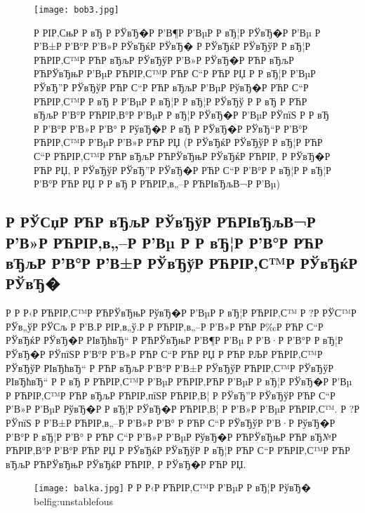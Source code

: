 \documentclass[a4paper,14pt]{extarticle}
\begin{document}
\begin{figure}[h!]
\centering
\texttt{[image: bob3.jpg]}
\caption{Р  РІР‚СњР  Р вЂ Р  РЎвЂ�Р  Р’В¶Р  Р’ВµР  Р вЂ¦Р  РЎвЂ�Р  Р’Вµ Р  Р’В±Р  Р’В°Р  Р’В»Р  РЎвЂќР  РЎвЂ� Р  РЎвЂќР  РЎвЂўР  Р вЂ¦Р РЋРІР‚С™Р РЋР вЂљР  РЎвЂўР  Р’В»Р  РЎвЂ�Р РЋР вЂљР РЋРЎвЂњР  Р’ВµР РЋРІР‚С™Р РЋР С“Р РЋР РЏ Р  Р вЂ¦Р  Р’ВµР  РЎвЂ”Р  РЎвЂўР РЋР С“Р РЋР вЂљР  Р’ВµР  РўвЂ�Р РЋР С“Р РЋРІР‚С™Р  Р вЂ Р  Р’ВµР  Р вЂ¦Р  Р вЂ¦Р  РЎвЂў Р  Р вЂ Р РЋР вЂљР  Р’В°Р РЋРІР‚В°Р  Р’ВµР  Р вЂ¦Р  РЎвЂ�Р  Р’ВµР  РЎпїЅ Р  Р вЂ Р  Р’В°Р  Р’В»Р  Р’В° Р  РўвЂ�Р  Р вЂ Р  РЎвЂ�Р  РЎвЂ“Р  Р’В°Р РЋРІР‚С™Р  Р’ВµР  Р’В»Р РЋР РЏ (Р  РЎвЂќР  РЎвЂўР  Р вЂ¦Р РЋР С“Р РЋРІР‚С™Р РЋР вЂљР РЋРЎвЂњР  РЎвЂќР РЋРІР‚ Р  РЎвЂ�Р РЋР РЏ, Р  РЎвЂўР  РЎвЂ”Р  РЎвЂ�Р РЋР С“Р  Р’В°Р  Р вЂ¦Р  Р вЂ¦Р  Р’В°Р РЋР РЏ Р  Р вЂ Р РЋРІР‚в„–Р РЋРІвЂљВ¬Р  Р’Вµ)}
\label{graph_fragment3}
\end{figure}


\subsection{Р  РЎСџР РЋР вЂљР  РЎвЂўР РЋРІвЂљВ¬Р  Р’В»Р РЋРІР‚в„–Р  Р’Вµ Р  Р вЂ¦Р  Р’В°Р РЋР вЂљР  Р’В°Р  Р’В±Р  РЎвЂўР РЋРІР‚С™Р  РЎвЂќР  РЎвЂ�}
 
Р  Р Р‹Р РЋРІР‚С™Р РЋРЎвЂњР  РўвЂ�Р  Р’ВµР  Р вЂ¦Р РЋРІР‚С™ Р  ?Р  РЎС™Р  РЎв„ўР  РЎСљ Р  Р’В­.Р  РІР‚в„ў.Р   Р РЋРІР‚в„–Р  Р’В»Р РЋР Р‰Р РЋР С“Р  РЎвЂќР  РЎвЂ�Р  РІвЂћвЂ“ Р РЋРЎвЂњР  Р’В¶Р  Р’Вµ Р  Р’В·Р  Р’В°Р  Р вЂ¦Р  РЎвЂ�Р  РЎпїЅР  Р’В°Р  Р’В»Р РЋР С“Р РЋР РЏ Р РЋР РЉР РЋРІР‚С™Р  РЎвЂўР  РІвЂћвЂ“ Р РЋР вЂљР  Р’В°Р  Р’В±Р  РЎвЂўР РЋРІР‚С™Р  РЎвЂўР  РІвЂћвЂ“ Р  Р вЂ  Р РЋРІР‚С™Р  Р’ВµР РЋРІР‚РЋР  Р’ВµР  Р вЂ¦Р  РЎвЂ�Р  Р’Вµ Р РЋРІР‚С™Р РЋР вЂљР РЋРІР‚пїЅР РЋРІР‚В¦ Р  РЎвЂ”Р  РЎвЂўР РЋР С“Р  Р’В»Р  Р’ВµР  РўвЂ�Р  Р вЂ¦Р  РЎвЂ�Р РЋРІР‚В¦ Р  Р’В»Р  Р’ВµР РЋРІР‚С™. Р  ?Р  РЎпїЅ Р  Р’В±Р РЋРІР‚в„–Р  Р’В»Р  Р’В° Р РЋР С“Р  РЎвЂўР  Р’В·Р  РўвЂ�Р  Р’В°Р  Р вЂ¦Р  Р’В° Р РЋР С“Р  Р’В»Р  Р’ВµР  РўвЂ�Р РЋРЎвЂњР РЋР вЂ№Р РЋРІР‚В°Р  Р’В°Р РЋР РЏ Р  РЎвЂќР  РЎвЂўР  Р вЂ¦Р РЋР С“Р РЋРІР‚С™Р РЋР вЂљР РЋРЎвЂњР  РЎвЂќР РЋРІР‚ Р  РЎвЂ�Р РЋР РЏ.
 
\begin{figure}[H]
  \texttt{[image: balka.jpg]}
  {Р  Р Р‹Р РЋРІР‚С™Р  Р’ВµР  Р вЂ¦Р  РўвЂ�}
\label{graph_fragment}bel{fig:unstablefous}
\end{figure}
\end{document}
